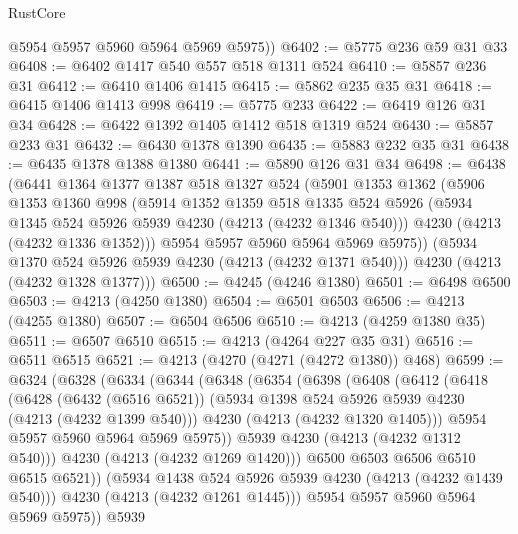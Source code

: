 \begin{lexlean}{RustCore}
\begin{coremodule}
        @5954
        @5957
        @5960
        @5964
        @5969
        @5975))
@6402 := @5775 @236 @59 @31 @33
@6408 := @6402 @1417 @540 @557 @518 @1311 @524
@6410 := @5857 @236 @31
@6412 := @6410 @1406 @1415
@6415 := @5862 @235 @35 @31
@6418 := @6415 @1406 @1413 @998
@6419 := @5775 @233
@6422 := @6419 @126 @31 @34
@6428 := @6422 @1392 @1405 @1412 @518 @1319 @524
@6430 := @5857 @233 @31
@6432 := @6430 @1378 @1390
@6435 := @5883 @232 @35 @31
@6438 := @6435 @1378 @1388 @1380
@6441 := @5890 @126 @31 @34
@6498 := @6438
    (@6441
      @1364
      @1377
      @1387
      @518
      @1327
      @524
      (@5901
        @1353
        @1362
        (@5906
          @1353
          @1360
          @998
          (@5914
            @1352
            @1359
            @518
            @1335
            @524
            @5926
            (@5934 @1345 @524 @5926 @5939 @4230 (@4213 (@4232 @1346 @540)))
            @4230
            (@4213 (@4232 @1336 @1352)))
          @5954
          @5957
          @5960
          @5964
          @5969
          @5975))
      (@5934 @1370 @524 @5926 @5939 @4230 (@4213 (@4232 @1371 @540)))
      @4230
      (@4213 (@4232 @1328 @1377)))
@6500 := @4245 (@4246 @1380)
@6501 := @6498 @6500
@6503 := @4213 (@4250 @1380)
@6504 := @6501 @6503
@6506 := @4213 (@4255 @1380)
@6507 := @6504 @6506
@6510 := @4213 (@4259 @1380 @35)
@6511 := @6507 @6510
@6515 := @4213 (@4264 @227 @35 @31)
@6516 := @6511 @6515
@6521 := @4213 (@4270 (@4271 (@4272 @1380)) @468)
@6599 := @6324
    (@6328
      (@6334
        (@6344
          (@6348
            (@6354
              (@6398
                (@6408
                  (@6412
                    (@6418
                      (@6428
                        (@6432 (@6516 @6521))
                        (@5934 @1398 @524 @5926 @5939 @4230 (@4213 (@4232 @1399 @540)))
                        @4230
                        (@4213 (@4232 @1320 @1405)))
                      @5954
                      @5957
                      @5960
                      @5964
                      @5969
                      @5975))
                  @5939
                  @4230
                  (@4213 (@4232 @1312 @540)))
                @4230
                (@4213 (@4232 @1269 @1420)))
              @6500
              @6503
              @6506
              @6510
              @6515
              @6521))
          (@5934 @1438 @524 @5926 @5939 @4230 (@4213 (@4232 @1439 @540)))
          @4230
          (@4213 (@4232 @1261 @1445)))
        @5954
        @5957
        @5960
        @5964
        @5969
        @5975))
    @5939

\end{coremodule}
\end{lexlean}
